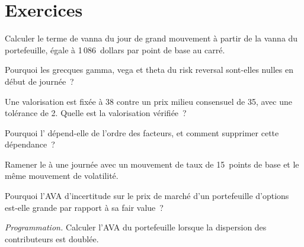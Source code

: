 \section{Exercices}

\begin{exercise}[$\star$]\label{exo:rc:pnl-explain-and-independent-price-verification:1}
Calculer le terme de vanna du jour de grand mouvement à partir de la vanna du portefeuille, égale à 1\,086~dollars par point de base au carré.
\end{exercise}

\begin{exercise}[$\star$]\label{exo:rc:pnl-explain-and-independent-price-verification:2}
Pourquoi les grecques gamma, vega et theta du risk reversal sont-elles nulles en début de journée~?
\end{exercise}

\begin{exercise}[$\star$]\label{exo:rc:pnl-explain-and-independent-price-verification:3}
Une valorisation est fixée à 38 contre un prix milieu consensuel de 35, avec une tolérance de 2. Quelle est la valorisation vérifiée~?
\end{exercise}

\begin{exercise}[$\star\star$]\label{exo:rc:pnl-explain-and-independent-price-verification:4}
Pourquoi l' dépend-elle de l'ordre des facteurs, et comment
supprimer cette dépendance~?
\end{exercise}

\begin{exercise}[$\star\star$]\label{exo:rc:pnl-explain-and-independent-price-verification:5}
Ramener le  à une journée avec un mouvement de taux de 15~points de base et le même mouvement de volatilité.
\end{exercise}

\begin{exercise}[$\star\star$]\label{exo:rc:pnl-explain-and-independent-price-verification:6}
Pourquoi l'AVA d'incertitude sur le prix de marché d'un portefeuille d'options est-elle grande par rapport à sa fair value~?
\end{exercise}

\begin{exercise}[$\star\star\star$]\label{exo:rc:pnl-explain-and-independent-price-verification:7}
\emph{Programmation.} Calculer l'AVA du portefeuille lorsque la dispersion des contributeurs est doublée.
\end{exercise}

